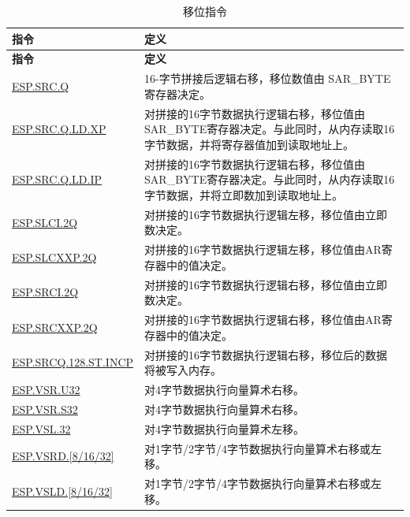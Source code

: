 \begin{longtable}[c]{|l|m{10cm}|}
    \caption{移位指令}
    \label{tab:pie-shift-instructions}\\
    \hline
    \rowcolor{lightgray}
    \textbf{指令} & \textbf{定义} \\\hline
    \endfirsthead
    \rowcolor{lightgray}
    \textbf{指令} & \textbf{定义} \\\hline
    \endhead
    \endfoot

    \hyperref[instruction:ESPSRCQ]{ESP.SRC.Q} & 16-字节拼接后逻辑右移，移位数值由 SAR\_BYTE 寄存器决定。
    \\\hline
\hyperref[instruction:ESPSRCQLDXP]{ESP.SRC.Q.LD.XP} & 对拼接的16字节数据执行逻辑右移，移位值由SAR\_BYTE寄存器决定。与此同时，从内存读取16字节数据，并将寄存器值加到读取地址上。 \\\hline
\hyperref[instruction:ESPSRCQLDIP]{ESP.SRC.Q.LD.IP} & 对拼接的16字节数据执行逻辑右移，移位值由SAR\_BYTE寄存器决定。与此同时，从内存读取16字节数据，并将立即数加到读取地址上。 \\\hline
\hyperref[instruction:ESPSLCI2Q]{ESP.SLCI.2Q} & 对拼接的16字节数据执行逻辑左移，移位值由立即数决定。 \\\hline
\hyperref[instruction:ESPSLCXXP2Q]{ESP.SLCXXP.2Q} & 对拼接的16字节数据执行逻辑左移，移位值由AR寄存器中的值决定。 \\\hline
\hyperref[instruction:ESPSRCI2Q]{ESP.SRCI.2Q} & 对拼接的16字节数据执行逻辑右移，移位值由立即数决定。 \\\hline
\hyperref[instruction:ESPSRCXXP2Q]{ESP.SRCXXP.2Q} & 对拼接的16字节数据执行逻辑右移，移位值由AR寄存器中的值决定。 \\\hline
\hyperref[instruction:ESPSRCQ128STINCP]{ESP.SRCQ.128.ST.INCP} & 对拼接的16字节数据执行逻辑右移，移位后的数据将被写入内存。 \\\hline
\hyperref[instruction:ESPVSRU32]{ESP.VSR.U32} & 对4字节数据执行向量算术右移。 \\\hline
\hyperref[instruction:ESPVSRS32]{ESP.VSR.S32} & 对4字节数据执行向量算术右移。 \\\hline
\hyperref[instruction:ESPVSL32]{ESP.VSL.32} & 对4字节数据执行向量算术左移。 \\\hline
\hyperref[instruction:ESPVSrd32]{ESP.VSRD.[8/16/32]} & 对1字节/2字节/4字节数据执行向量算术右移或左移。 \\\hline
\hyperref[instruction:ESPVSLD32]{ESP.VSLD.[8/16/32]} & 对1字节/2字节/4字节数据执行向量算术右移或左移。 \\\hline

\end{longtable}